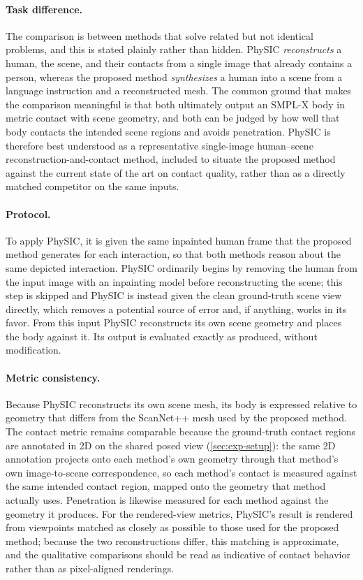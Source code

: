 \paragraph{Task difference.} The comparison is between methods that solve related but not identical problems, and this is stated plainly rather than hidden. PhySIC \emph{reconstructs} a human, the scene, and their contacts from a single image that already contains a person, whereas the proposed method \emph{synthesizes} a human into a scene from a language instruction and a reconstructed mesh. The common ground that makes the comparison meaningful is that both ultimately output an SMPL-X body in metric contact with scene geometry, and both can be judged by how well that body contacts the intended scene regions and avoids penetration. PhySIC is therefore best understood as a representative single-image human--scene reconstruction-and-contact method, included to situate the proposed method against the current state of the art on contact quality, rather than as a directly matched competitor on the same inputs.

\paragraph{Protocol.} To apply PhySIC, it is given the same inpainted human frame that the proposed method generates for each interaction, so that both methods reason about the same depicted interaction. PhySIC ordinarily begins by removing the human from the input image with an inpainting model before reconstructing the scene; this step is skipped and PhySIC is instead given the clean ground-truth scene view directly, which removes a potential source of error and, if anything, works in its favor. From this input PhySIC reconstructs its own scene geometry and places the body against it. Its output is evaluated exactly as produced, without modification.

\paragraph{Metric consistency.} Because PhySIC reconstructs its own scene mesh, its body is expressed relative to geometry that differs from the ScanNet++ mesh used by the proposed method. The contact metric remains comparable because the ground-truth contact regions are annotated in 2D on the shared posed view (\cref{sec:exp-setup}): the same 2D annotation projects onto each method's own geometry through that method's own image-to-scene correspondence, so each method's contact is measured against the same intended contact region, mapped onto the geometry that method actually uses. Penetration is likewise measured for each method against the geometry it produces. For the rendered-view metrics, PhySIC's result is rendered from viewpoints matched as closely as possible to those used for the proposed method; because the two reconstructions differ, this matching is approximate, and the qualitative comparisons should be read as indicative of contact behavior rather than as pixel-aligned renderings.

